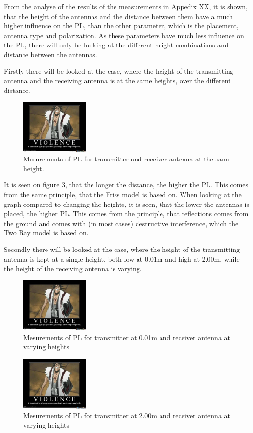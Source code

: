 From the analyse of the results of the measurements in Appedix XX, it is shown, that the height of the antennas and the distance between them have a much higher influence on the PL, than the other parameter, which is the placement, antenna type and polarization. As these parameters have much less influence on the PL, there will only be looking at the different height combinations and distance between the antennas.

Firstly there will be looked at the case, where the height of the transmitting antenna and the receiving antenna is at the same heights, over the different distance.

\begin{figure}
\centering
\includegraphics[width=0.3\textwidth]{figures/bleach-3712665.jpg}
\caption{Mesurements of PL for transmitter and receiver antenna at the same height.}
\label{Meas1}
\end{figure}

It is seen on figure \ref{Meas1}, that the longer the distance, the higher the PL. This comes from the same principle, that the Friss model is based on. When looking at the graph compared to changing the heights, it is seen, that the lower the antennas is placed, the higher PL. This comes from the principle, that reflections comes from the ground and comes with (in most cases) destructive interference, which the Two Ray model is based on. 

Secondly there will be looked at the case, where the height of the transmitting antenna is kept at a single height, both low at 0.01m and high at 2.00m, while the height of the receiving antenna is varying.

\begin{figure}
\centering
\includegraphics[width=0.3\textwidth]{figures/bleach-3712665.jpg}
\caption{Mesurements of PL for transmitter at 0.01m and receiver antenna at varying heights}
\label{Meas1}
\end{figure}

\begin{figure}
\centering
\includegraphics[width=0.3\textwidth]{figures/bleach-3712665.jpg}
\caption{Mesurements of PL for transmitter at 2.00m and receiver antenna at varying heights}
\label{Meas1}
\end{figure}